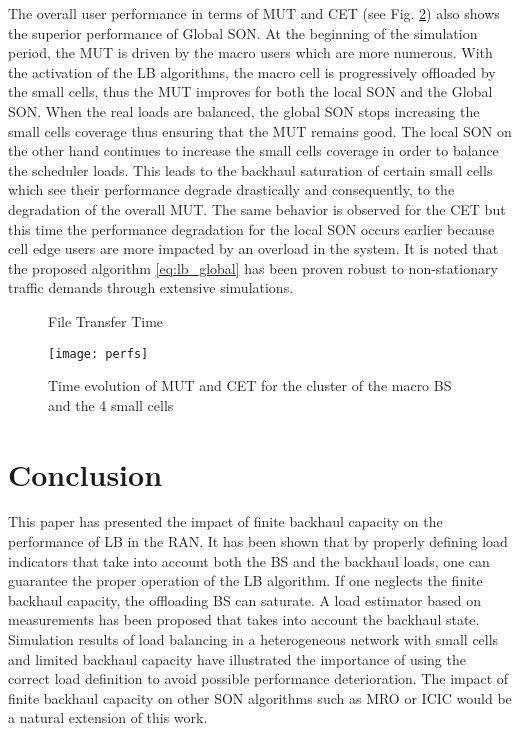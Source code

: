 \documentclass[10pt,draftclsnofoot,onecolumn]{IEEEtran}
\begin{document}
The overall user performance in terms of \ac{MUT} and \ac{CET}
(see Fig. \ref{fig:perfs}) also
shows the superior performance of Global SON. At the beginning
of the simulation period, the \ac{MUT} is driven by the macro users
which are more numerous. With the activation of the \ac{LB}
algorithms, the macro cell is progressively offloaded by the small cells,
thus the \ac{MUT} improves for both the local SON and the Global SON.
When the real loads are balanced, the global SON stops increasing the
small cells coverage thus ensuring that the \ac{MUT} remains good. The local SON
on the other hand continues to increase the small cells coverage in
order to balance the scheduler loads. This leads to the backhaul 
saturation of certain small cells which see their performance degrade 
drastically and consequently, to the degradation of the overall \ac{MUT}.
The same behavior is observed for the \ac{CET} but this time the performance
degradation for the local SON occurs earlier because cell edge users are more
impacted by an overload in the system. It is noted that the proposed algorithm
\eqref{eq:lb_global} has been proven robust to non-stationary traffic
demands through extensive simulations.


\begin{figure}[ht]
\centering
{}
\quad
{}
\caption{File Transfer Time } \label{fig:ftts}
\end{figure}


\begin{figure}[ht]
\centering
\texttt{[image: perfs]}
\caption{ Time evolution of \ac{MUT} and \ac{CET} for the cluster of
the macro BS and the 4 small cells} \label{fig:perfs}
\end{figure}


\section{Conclusion} \label{sec:conclusion}
This paper has presented the impact of finite backhaul capacity on
the performance of \ac{LB} in the \ac{RAN}. It has been shown
that by properly defining load indicators that take into account
both the \ac{BS} and the backhaul loads, one can guarantee the
proper operation of the \ac{LB} algorithm. If one neglects
the finite backhaul capacity, the offloading \ac{BS} can saturate. A
load estimator based on measurements has been proposed that takes
 into account the backhaul state. Simulation results of load
balancing in a heterogeneous network with small cells and limited
backhaul capacity have illustrated the importance of using the
correct load definition to avoid possible performance
deterioration. The impact of finite backhaul capacity on other
\ac{SON} algorithms such as \ac{MRO} or \ac{ICIC} would be a natural
extension of this work.







\end{document}
